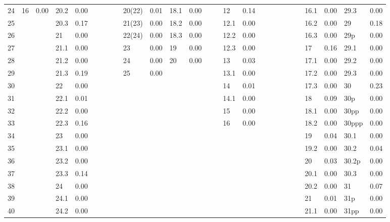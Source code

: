 \begin{table}[ht]
\begin{tabular}{rlrlrlrlrlrlrlrlrlrlrlrlrlr}
  24 & 16 & 0.00 & 20.2 & 0.00 &  &  &  &  & 20(22) & 0.01 & 18.1 & 0.00 &  &  & 12 & 0.14 &  &  &  &  &  &  & 16.1 & 0.00 & 29.3 & 0.00 \\ 
  25 &  &  & 20.3 & 0.17 &  &  &  &  & 21(23) & 0.00 & 18.2 & 0.00 &  &  & 12.1 & 0.00 &  &  &  &  &  &  & 16.2 & 0.00 & 29 & 0.18 \\ 
  26 &  &  & 21 & 0.00 &  &  &  &  & 22(24) & 0.00 & 18.3 & 0.00 &  &  & 12.2 & 0.00 &  &  &  &  &  &  & 16.3 & 0.00 & 29p & 0.00 \\ 
  27 &  &  & 21.1 & 0.00 &  &  &  &  & 23 & 0.00 & 19 & 0.00 &  &  & 12.3 & 0.00 &  &  &  &  &  &  & 17 & 0.16 & 29.1 & 0.00 \\ 
  28 &  &  & 21.2 & 0.00 &  &  &  &  & 24 & 0.00 & 20 & 0.00 &  &  & 13 & 0.03 &  &  &  &  &  &  & 17.1 & 0.00 & 29.2 & 0.00 \\ 
  29 &  &  & 21.3 & 0.19 &  &  &  &  & 25 & 0.00 &  &  &  &  & 13.1 & 0.00 &  &  &  &  &  &  & 17.2 & 0.00 & 29.3 & 0.00 \\ 
  30 &  &  & 22 & 0.00 &  &  &  &  &  &  &  &  &  &  & 14 & 0.01 &  &  &  &  &  &  & 17.3 & 0.00 & 30 & 0.23 \\ 
  31 &  &  & 22.1 & 0.01 &  &  &  &  &  &  &  &  &  &  & 14.1 & 0.00 &  &  &  &  &  &  & 18 & 0.09 & 30p & 0.00 \\ 
  32 &  &  & 22.2 & 0.00 &  &  &  &  &  &  &  &  &  &  & 15 & 0.00 &  &  &  &  &  &  & 18.1 & 0.00 & 30pp & 0.00 \\ 
  33 &  &  & 22.3 & 0.16 &  &  &  &  &  &  &  &  &  &  & 16 & 0.00 &  &  &  &  &  &  & 18.2 & 0.00 & 30ppp & 0.00 \\ 
  34 &  &  & 23 & 0.00 &  &  &  &  &  &  &  &  &  &  &  &  &  &  &  &  &  &  & 19 & 0.04 & 30.1 & 0.00 \\ 
  35 &  &  & 23.1 & 0.00 &  &  &  &  &  &  &  &  &  &  &  &  &  &  &  &  &  &  & 19.2 & 0.00 & 30.2 & 0.04 \\ 
  36 &  &  & 23.2 & 0.00 &  &  &  &  &  &  &  &  &  &  &  &  &  &  &  &  &  &  & 20 & 0.03 & 30.2p & 0.00 \\ 
  37 &  &  & 23.3 & 0.14 &  &  &  &  &  &  &  &  &  &  &  &  &  &  &  &  &  &  & 20.1 & 0.00 & 30.3 & 0.00 \\ 
  38 &  &  & 24 & 0.00 &  &  &  &  &  &  &  &  &  &  &  &  &  &  &  &  &  &  & 20.2 & 0.00 & 31 & 0.07 \\ 
  39 &  &  & 24.1 & 0.00 &  &  &  &  &  &  &  &  &  &  &  &  &  &  &  &  &  &  & 21 & 0.01 & 31p & 0.00 \\ 
  40 &  &  & 24.2 & 0.00 &  &  &  &  &  &  &  &  &  &  &  &  &  &  &  &  &  &  & 21.1 & 0.00 & 31pp & 0.00 \\ 

\end{tabular}
\end{table}
